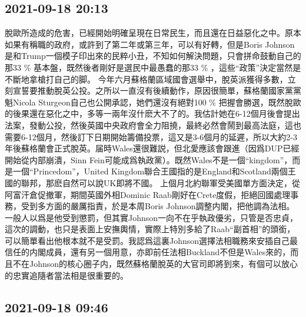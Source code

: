 \documentclass[twocolumn]{ctexart}
\begin{document}
\subsection*{2021-09-18 20:13}

脫歐所造成的危害，已經開始明確呈現在日常民生，而且還在日益惡化之中。原本如果有稱職的政府，或許到了第二年或第三年，可以有好轉，但是Boris Johnson是和Trump一個模子印出來的民粹小丑，不知如何解決問題，只會拼命鼓動自己的那33 \% 基本盤，既然後者剛好是選民中最愚蠢的那33 \% ，這些“政策”決定當然是不斷地拿槍打自己的脚。
今年六月蘇格蘭區域國會選舉中，脫英派獲得多數，立刻宣誓要推動脫英公投。之所以一直沒有後續動作，原因很簡單，蘇格蘭國家黨黨魁Nicola Sturgeon自己也公開承認，她們還沒有絕對100 \% 把握會勝選，既然脫歐的後果還在惡化之中，多等一兩年沒什麽大不了的。我估計她在6-12個月後會提出法案，發動公投，然後英國中央政府會全力阻撓，最終必然會鬧到最高法庭，這也需要6-12個月，然後訂下日期開始籌備投票，這又是3-6個月的延遲，所以大約2-3年後蘇格蘭會正式脫英。届時Wales還很難説，但北愛應該會跟進（因爲DUP已經開始從内部崩潰，Sinn Fein可能成爲執政黨）。既然Wales不是一個“kingdom”，而是一個“Princedom”，United Kingdom聯合王國指的是England和Scotland兩個王國的聯邦，那麽自然可以說UK即將不國。
上個月北約聯軍受美國單方面決定，從阿富汗倉促撤軍，期間英國外相Dominic Raab剛好在Crete度假，拒絕回國處理事務，受到多方面的嚴厲指責，於是本周Boris Johnson調整内閣，把他調為法相。一般人以爲是他受到懲罰，但其實Johnson一向不在乎執政優劣，只管是否忠貞，這次的調動，也只是表面上安撫輿情，實際上特別多給了Raab“副首相”的頭銜，可以簡單看出他根本就不是受罰。我認爲這裏Johnson選擇法相職務來安插自己最信任的内閣成員，還有另一個用意，亦即前任法相Buckland不但是Wales來的，而且不在Johnson的核心圈子内，既然蘇格蘭脫英的大官司即將到來，有個可以放心的忠實追隨者當法相是很重要的。
\subsection*{2021-09-18 09:46}
\end{document}
